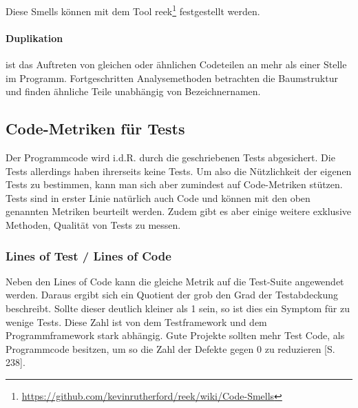 Diese Smells können mit dem Tool reek\footnote{\url{https://github.com/kevinrutherford/reek/wiki/Code-Smells}} festgestellt werden.
\paragraph{Duplikation} ist das Auftreten von gleichen oder ähnlichen Codeteilen an mehr als einer Stelle im Programm. Fortgeschritten Analysemethoden betrachten die Baumstruktur und finden ähnliche Teile unabhängig von Bezeichnernamen.

\subsection{Code-Metriken für Tests}
\label{sec:metrics}
Der Programmcode wird i.d.R. durch die geschriebenen Tests abgesichert. Die Tests allerdings haben ihrerseits keine Tests. Um also die Nützlichkeit der eigenen Tests zu bestimmen, kann man sich aber zumindest auf Code-Metriken stützen.
Tests sind in erster Linie natürlich auch Code und können mit den oben genannten Metriken beurteilt werden. Zudem gibt es aber einige weitere exklusive Methoden, Qualität von Tests zu messen. 

\subsubsection{Lines of Test / Lines of Code}
Neben den Lines of Code kann die gleiche Metrik auf die Test-Suite angewendet werden. Daraus ergibt sich ein Quotient der grob den Grad der Testabdeckung beschreibt. Sollte dieser deutlich kleiner als 1 sein, so ist dies ein Symptom für zu wenige Tests. Diese Zahl ist von dem Testframework und dem Programmframework stark abhängig. Gute Projekte sollten mehr Test Code, als Programmcode besitzen, um so die Zahl der Defekte gegen 0 zu reduzieren \citep{hunt_pragmatic_1999}[S. 238]. 
        
